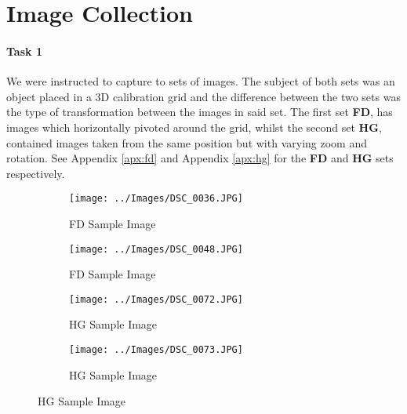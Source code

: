 \section{Image Collection}

\paragraph{Task 1} We were instructed to capture to sets of images. The subject of both sets was an object placed in a 3D calibration grid and the difference between the two sets was the type of transformation between the images in said set. The first set \textbf{FD}, has images which horizontally pivoted around the grid, whilst the second set \textbf{HG}, contained images taken from the same position but with varying zoom and rotation. See Appendix \ref{apx:fd} and Appendix \ref{apx:hg} for the \textbf{FD} and \textbf{HG} sets respectively.

\begin{figure}[ht]
\begin{center}
   \begin{subfigure}{0.49\linewidth}
   \centering
   \texttt{[image: ../Images/DSC\_0036.JPG]}
   \caption{FD Sample Image}
   \label{fd:subfig:1}
   \end{subfigure}
   \begin{subfigure}{0.49\linewidth}
   \centering
   \texttt{[image: ../Images/DSC\_0048.JPG]}
   \caption{FD Sample Image}
   \label{fd:subfig:2}
   \end{subfigure}
\newline
   \begin{subfigure}{0.49\linewidth}
   \centering
   \texttt{[image: ../Images/DSC\_0072.JPG]}
   \caption{HG Sample Image}
   \label{hg:subfig:1}
   \end{subfigure}
   \begin{subfigure}{0.49\linewidth}
   \centering
   \texttt{[image: ../Images/DSC\_0073.JPG]}
   \caption{HG Sample Image}
   \label{hg:subfig:2}
   \end{subfigure}
\end{center}
\label{fig:1}
\end{figure}